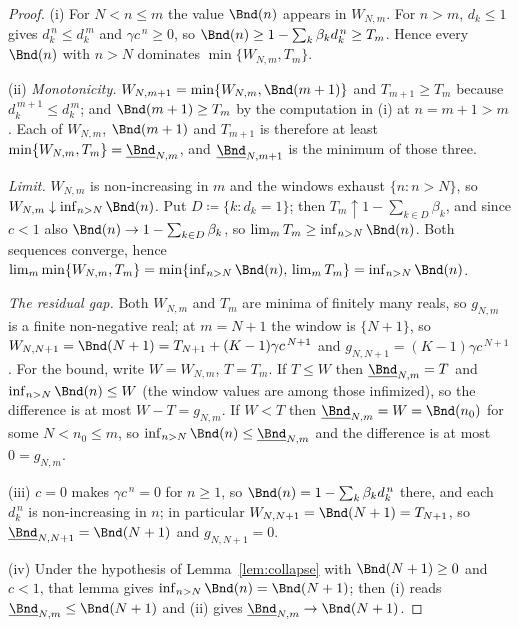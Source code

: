 \begin{proof}
(i) For $N<n\le m$ the value $\Bnd(n)$ appears in $W_{N,m}$. For $n>m$,
$d_k\le1$ gives $d_k^{\,n}\le d_k^{\,m}$ and $\gamma c^{\,n}\ge0$, so
$\Bnd(n)\ge1-\sum_k\beta_kd_k^{\,n}\ge T_m$. Hence every $\Bnd(n)$ with $n>N$
dominates $\min\{W_{N,m},T_m\}$.

(ii) \emph{Monotonicity.} $W_{N,m+1}=\min\{W_{N,m},\Bnd(m+1)\}$ and
$T_{m+1}\ge T_m$ because $d_k^{\,m+1}\le d_k^{\,m}$; and $\Bnd(m+1)\ge T_m$ by
the computation in (i) at $n=m+1>m$. Each of $W_{N,m}$, $\Bnd(m+1)$ and
$T_{m+1}$ is therefore at least $\min\{W_{N,m},T_m\}=\underline{\Bnd}_{N,m}$,
and $\underline{\Bnd}_{N,m+1}$ is the minimum of those three.

\emph{Limit.} $W_{N,m}$ is non-increasing in $m$ and the windows exhaust
$\{n:n>N\}$, so $W_{N,m}\downarrow\inf_{n>N}\Bnd(n)$. Put
$D\coloneqq\{k:d_k=1\}$; then $T_m\uparrow1-\sum_{k\in D}\beta_k$, and since
$c<1$ also $\Bnd(n)\to1-\sum_{k\in D}\beta_k$, so
$\lim_mT_m\ge\inf_{n>N}\Bnd(n)$. Both sequences converge, hence
$\lim_m\min\{W_{N,m},T_m\}=\min\{\inf_{n>N}\Bnd(n),\,\lim_mT_m\}
=\inf_{n>N}\Bnd(n)$.

\emph{The residual gap.} Both $W_{N,m}$ and $T_m$ are minima of finitely many
reals, so $g_{N,m}$ is a finite non-negative real; at $m=N+1$ the window is
$\{N+1\}$, so $W_{N,N+1}=\Bnd(N+1)=T_{N+1}+(K-1)\gamma c^{\,N+1}$ and
$g_{N,N+1}=(K-1)\gamma c^{\,N+1}$. For the bound, write $W=W_{N,m}$, $T=T_m$.
If $T\le W$ then $\underline{\Bnd}_{N,m}=T$ and $\inf_{n>N}\Bnd(n)\le W$ (the
window values are among those infimized), so the difference is at most
$W-T=g_{N,m}$. If $W<T$ then $\underline{\Bnd}_{N,m}=W=\Bnd(n_0)$ for some
$N<n_0\le m$, so $\inf_{n>N}\Bnd(n)\le\underline{\Bnd}_{N,m}$ and the
difference is at most $0=g_{N,m}$.

(iii) $c=0$ makes $\gamma c^{\,n}=0$ for $n\ge1$, so
$\Bnd(n)=1-\sum_k\beta_kd_k^{\,n}$ there, and each $d_k^{\,n}$ is
non-increasing in $n$; in particular $W_{N,N+1}=\Bnd(N+1)=T_{N+1}$, so
$\underline{\Bnd}_{N,N+1}=\Bnd(N+1)$ and $g_{N,N+1}=0$.

(iv) Under the hypothesis of Lemma~\ref{lem:collapse} with $\Bnd(N+1)\ge0$ and
$c<1$, that lemma gives $\inf_{n>N}\Bnd(n)=\Bnd(N+1)$; then (i) reads
$\underline{\Bnd}_{N,m}\le\Bnd(N+1)$ and (ii) gives
$\underline{\Bnd}_{N,m}\to\Bnd(N+1)$.
\end{proof}
